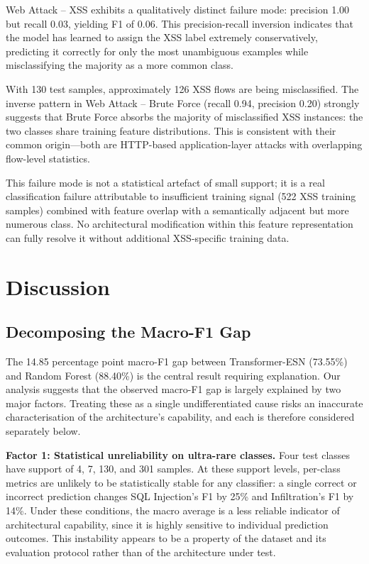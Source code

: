 \documentclass[5p,times]{elsarticle}
\begin{document}
	Web Attack -- XSS exhibits a qualitatively distinct failure mode:
	precision 1.00 but recall 0.03, yielding F1 of 0.06. This
	precision-recall inversion indicates that the model has learned
	to assign the XSS label extremely conservatively, predicting it
	correctly for only the most unambiguous examples while
	misclassifying the majority as a more common class.
	
	With 130 test samples, approximately 126 XSS flows are being
	misclassified. The inverse pattern in Web Attack -- Brute Force
	(recall 0.94, precision 0.20) strongly suggests that Brute Force
	absorbs the majority of misclassified XSS instances: the two
	classes share training feature distributions. This is consistent
	with their common origin---both are HTTP-based application-layer
	attacks with overlapping flow-level statistics.
	
	This failure mode is not a statistical artefact of small support; it
	is a real classification failure attributable to insufficient training
	signal (522 XSS training samples) combined with feature overlap with
	a semantically adjacent but more numerous class. No architectural
	modification within this feature representation can fully resolve it
	without additional XSS-specific training data.
	
	\section{Discussion}
	\label{sec:discussion}
	
	\subsection{Decomposing the Macro-F1 Gap}
	\label{subsec:decompose}
	
	The 14.85 percentage point macro-F1 gap between Transformer-ESN
	(73.55\%) and Random Forest (88.40\%) is the central result requiring
	explanation. Our analysis suggests that the observed macro-F1 gap is
	largely explained by two major factors. Treating these as a single
	undifferentiated cause risks an inaccurate characterisation of the
	architecture's capability, and each is therefore considered separately
	below.
	
	\textbf{Factor 1: Statistical unreliability on ultra-rare classes.}
	Four test classes have support of 4, 7, 130, and 301 samples. At these
	support levels, per-class metrics are unlikely to be statistically
	stable for any classifier: a single correct or incorrect prediction
	changes SQL Injection's F1 by 25\% and Infiltration's F1 by 14\%. Under
	these conditions, the macro average is a less reliable indicator of
	architectural capability, since it is highly sensitive to individual
	prediction outcomes. This instability appears to be a property of the
	dataset and its evaluation protocol rather than of the architecture
	under test.
	
\end{document}
